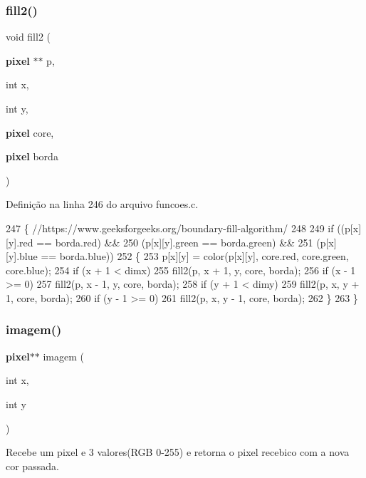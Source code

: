 \subsubsection{fill2()}
{\footnotesize\ttfamily void fill2 (\begin{DoxyParamCaption}\item[{\textbf{ pixel} $\ast$$\ast$}]{p,  }\item[{int}]{x,  }\item[{int}]{y,  }\item[{\textbf{ pixel}}]{core,  }\item[{\textbf{ pixel}}]{borda }\end{DoxyParamCaption})}



Definição na linha 246 do arquivo funcoes.\+c.


\begin{DoxyCode}
247 \{ \textcolor{comment}{//https://www.geeksforgeeks.org/boundary-fill-algorithm/}
248 
249     \textcolor{keywordflow}{if} ((p[x][y].red == borda.red) &&
250         (p[x][y].green == borda.green) &&
251         (p[x][y].blue == borda.blue))
252     \{
253         p[x][y] = color(p[x][y], core.red, core.green, core.blue);
254         \textcolor{keywordflow}{if} (x + 1 < dimx)
255             fill2(p, x + 1, y, core, borda);
256         \textcolor{keywordflow}{if} (x - 1 >= 0)
257             fill2(p, x - 1, y, core, borda);
258         \textcolor{keywordflow}{if} (y + 1 < dimy)
259             fill2(p, x, y + 1, core, borda);
260         \textcolor{keywordflow}{if} (y - 1 >= 0)
261             fill2(p, x, y - 1, core, borda);
262     \}
263 \}
\end{DoxyCode}
\mbox{\label{funcoes_8h_a9657bb5a15ff4a2b2ce147096346ff68}} 
\subsubsection{imagem()}
{\footnotesize\ttfamily \textbf{ pixel}$\ast$$\ast$ imagem (\begin{DoxyParamCaption}\item[{int}]{x,  }\item[{int}]{y }\end{DoxyParamCaption})}



Recebe um pixel e 3 valores(R\+GB 0-\/255) e retorna o pixel recebico com a nova cor passada. 

